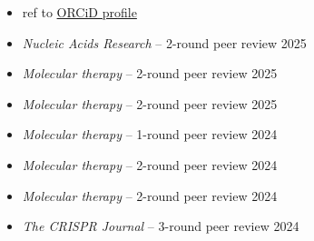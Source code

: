 






% 





\begin{itemize}
    \item[] \hfill ref to \href{https://orcid.org/0000-0002-4934-4731}{ORCiD profile}
    \item \textit{Nucleic Acids Research} -- 2-round peer review \hfill 2025
    \item \textit{Molecular therapy} -- 2-round peer review \hfill 2025
    \item \textit{Molecular therapy} -- 2-round peer review \hfill 2025
    \item \textit{Molecular therapy} -- 1-round peer review \hfill 2024
    \item \textit{Molecular therapy} -- 2-round peer review \hfill 2024
    \item \textit{Molecular therapy} -- 2-round peer review \hfill 2024
    \item \textit{The CRISPR Journal} -- 3-round peer review \hfill 2024
\end{itemize}


